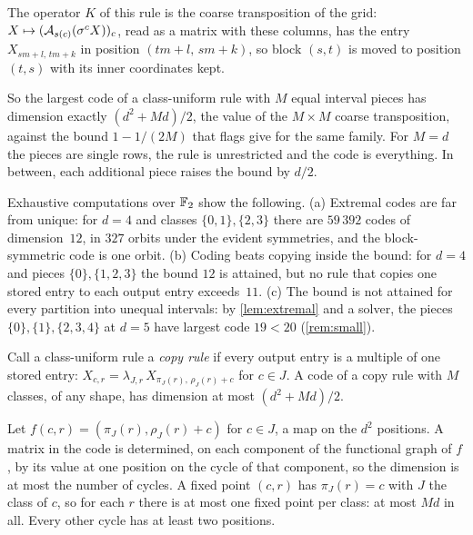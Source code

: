 The operator $K$ of this rule is the coarse transposition of the grid: $X\mapsto(\mathcal{A}_{s(c)}(\sigma^cX))_c$, read as a
matrix with these columns, has the entry $X_{sm+l,\,tm+k}$ in position $(tm+l,\,sm+k)$, so block $(s,t)$ is moved to
position $(t,s)$ with its inner coordinates kept.

So the largest code of a class-uniform rule with $M$ equal interval pieces has dimension exactly $(d^2+Md)/2$, the
value of the $M\times M$ coarse transposition, against the bound $1-1/(2M)$ that flags give for the same family. For
$M=d$ the pieces are single rows, the rule is unrestricted and the code is everything. In between, each additional
piece raises the bound by $d/2$.

\begin{remark}\label{rem:extremal}
Exhaustive computations over $\mathbb{F}_2$ show the following.
(a) Extremal codes are far from unique: for $d=4$ and classes $\{0,1\},\{2,3\}$ there are $59\,392$ codes of
dimension~$12$, in $327$ orbits under the evident symmetries, and the block-symmetric code is one orbit.
(b) Coding beats copying inside the bound: for $d=4$ and pieces $\{0\},\{1,2,3\}$ the bound $12$ is attained, but no
rule that copies one stored entry to each output entry exceeds~$11$.
(c) The bound is not attained for every partition into unequal intervals: by \cref{lem:extremal} and a solver, the
pieces $\{0\},\{1\},\{2,3,4\}$ at $d=5$ have largest code $19<20$ (\cref{rem:small}).
\end{remark}

\begin{proposition}\label{prop:copy}
\notformalized
Call a class-uniform rule a \emph{copy rule} if every output entry is a multiple of one stored entry:
$X_{c,r}=\lambda_{J,r}\,X_{\pi_J(r),\,\rho_J(r)+c}$ for $c\in J$. A code of a copy rule with $M$ classes, of any shape,
has dimension at most $(d^2+Md)/2$.
\end{proposition}

\begin{informalproof}
Let $f(c,r)=(\pi_J(r),\rho_J(r)+c)$ for $c\in J$, a map on the $d^2$ positions. A matrix in the code is determined, on
each component of the functional graph of $f$, by its value at one position on the cycle of that component, so the
dimension is at most the number of cycles. A fixed point $(c,r)$ has $\pi_J(r)=c$ with $J$ the class of $c$, so for each
$r$ there is at most one fixed point per class: at most $Md$ in all. Every other cycle has at least two positions.
\end{informalproof}

